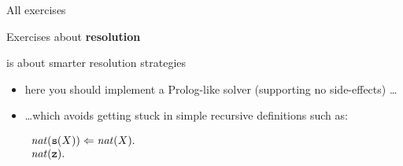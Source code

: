 \documentclass[presentation]{beamer}\mode<presentation>{\usetheme{AMSBolognaFC}}
\begin{document}
\begin{frame}[allowframebreaks]{All exercises}
\begin{block}{Exercises about \textbf{resolution}}
\begin{description}
            \startExercise
            \item[\currentExercise] is about smarter resolution strategies
            \begin{itemize}
                \item here you should implement a Prolog-like solver (supporting no side-effects) \ldots
                \item \ldots which avoids getting stuck in simple recursive definitions such as:
                \begin{center}
                    $\begin{array}{l}
                        \text{\textit{nat}}(\mathtt{s}(X)) \Leftarrow \text{\textit{nat}}(X) \mathtt{.}
                        \\
                        \text{\textit{nat}}(\mathtt{z}) \mathtt{.}
                    \end{array}$
                \end{center}
            \end{itemize} 
        \end{description}
    \end{block}
\end{frame}

\section*{}

\frame{\titlepage}

\section*{\refname}

\begin{frame}[c,noframenumbering]{\refname}
    \scriptsize
    
    
\end{frame}

\end{document}
